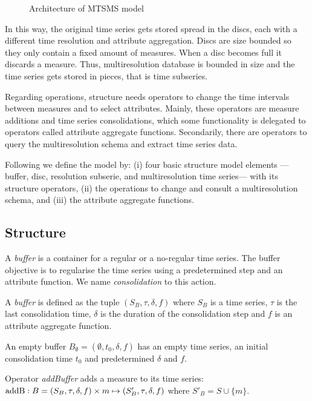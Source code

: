 \begin{figure}
  \centering
  
  \caption{Architecture of MTSMS model}
  \label{fig:model:mtsdb}
\end{figure}


In this way, the original time series gets stored spread in the discs,
each with a different time resolution and attribute aggregation.
Discs are size bounded so they only contain a fixed amount of
measures. When a disc becomes full it discards a measure. Thus,
multiresolution database is bounded in size and the time series gets
stored in pieces, that is time subseries.

Regarding operations,  structure needs operators to change
the time intervals between measures and to select attributes. Mainly,
these operators are measure additions and time series consolidations,
which some functionality is delegated to operators called attribute
aggregate functions. Secondarily, there are operators to query the
multiresolution schema and extract time series data.


Following we define the  model by: (i) four basic
structure model elements ---buffer, disc, resolution subserie, and
multiresolution time series--- with its structure operators, (ii) the
operations to change and consult a multiresolution schema, and (iii)
the attribute aggregate functions.



\subsection{Structure}

A \emph{buffer} is a container for a regular or a no-regular time
series. The buffer objective is to regularise the time series using a
predetermined step and an attribute function. We name
\emph{consolidation} to this action.
\begin{definition}%
  A \emph{buffer} is defined as the tuple $(S_B,\tau,\delta,f)$ where
  $S_B$ is a time series, $\tau$ is the last consolidation time,
  $\delta$ is the duration of the consolidation step and $f$ is an
  attribute aggregate function.

  An empty buffer $B_{\emptyset} = (\emptyset,t_0, \delta, f)$ has an
  empty time series, an initial consolidation time $t_0$ and
  predetermined $\delta$ and $f$.
\end{definition}

Operator \emph{addBuffer} adds a measure to its time series:
$\operatorname{addB}: B = (S_B,\tau,\delta,f) \times m \mapsto
(S'_B,\tau,\delta,f)$ where $S'_B = S \cup \{m\} $.

